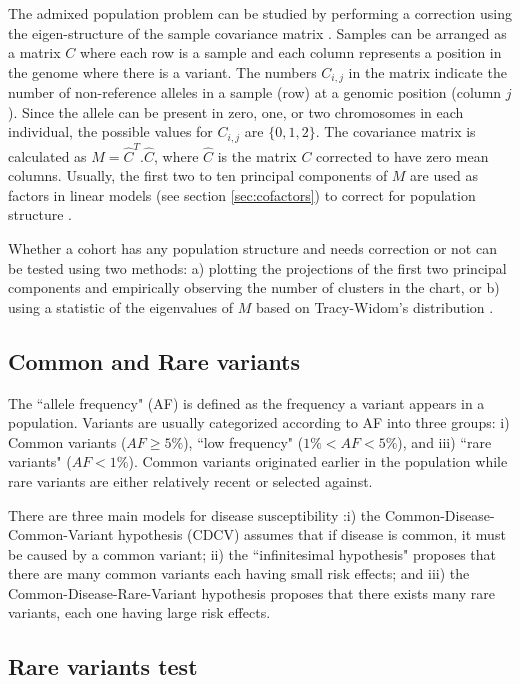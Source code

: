 The admixed population problem can be studied by performing a correction using the eigen-structure of the sample covariance matrix \cite{patterson2006population}. Samples can be arranged as a matrix $C$ where each row is a sample and each column represents a position in the genome where there is a variant. The numbers $C_{i,j}$ in the matrix indicate the number of non-reference alleles in a sample (row) at a genomic position (column $j$). Since the allele can be present in zero, one, or two chromosomes in each individual, the possible values for $C_{i,j}$ are $\{0, 1, 2\}$. The covariance matrix is calculated as $M= \hat{C}^T . \hat{C}$, where $\hat{C}$ is the matrix $C$ corrected to have zero mean columns. Usually, the first two to ten principal components of $M$ are used as factors in linear models (see section \ref{sec:cofactors}) to correct for population structure \cite{patterson2006population}.

Whether a cohort has any population structure and needs correction or not can be tested using two methods: a) plotting the projections of the first two principal components and empirically observing the number of clusters in the chart, or b) using a statistic of the eigenvalues of $M$ based on Tracy-Widom's distribution \cite{patterson2006population}.

\subsection{Common and Rare variants\label{sec:comonrare}}

The ``allele frequency" (AF) is defined as the frequency a variant appears in a population. Variants are usually categorized according to AF into three groups: i) Common variants ($AF \geq 5\%$), ``low frequency" ($1\% < AF < 5\%$), and iii) ``rare variants" ($AF < 1\%$). Common variants originated earlier in the population while rare variants are either relatively recent or selected against.

There are three main models for disease susceptibility  \cite{hartl1997principles, gibson2012rare}:i) the Common-Disease-Common-Variant hypothesis (CDCV) assumes that if disease is common, it must be caused by a common variant; ii) the ``infinitesimal hypothesis" proposes that there are many common variants each having small risk effects; and iii) the Common-Disease-Rare-Variant hypothesis proposes that there exists many rare variants, each one having large risk effects.

\subsection{Rare variants test}

